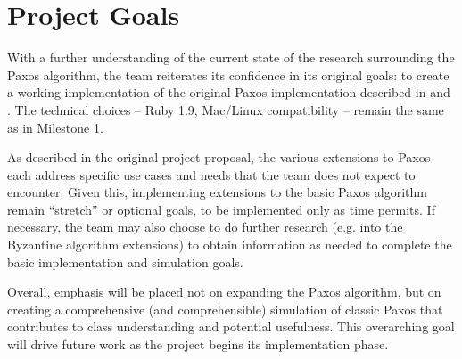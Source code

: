 \documentclass{article}
\begin{document}
\section{Project Goals}

With a further understanding of the current state of the research surrounding the Paxos algorithm, the team reiterates its confidence in its original goals: to create a working implementation of the original Paxos implementation described in \cite{paxos} and \cite{simple-paxos}. The technical choices -- Ruby 1.9, Mac/Linux compatibility -- remain the same as in Milestone 1.

As described in the original project proposal, the various extensions to Paxos each address specific use cases and needs that the team does not expect to encounter. Given this, implementing extensions to the basic Paxos algorithm remain ``stretch'' or optional goals, to be implemented only as time permits. If necessary, the team may also choose to do further research (e.g. into the Byzantine algorithm extensions) to obtain information as needed to complete the basic implementation and simulation goals.

Overall, emphasis will be placed not on expanding the Paxos algorithm, but on creating a comprehensive (and comprehensible) simulation of classic Paxos that contributes to class understanding and potential usefulness. This overarching goal will drive future work as the project begins its implementation phase.



\end{document}
